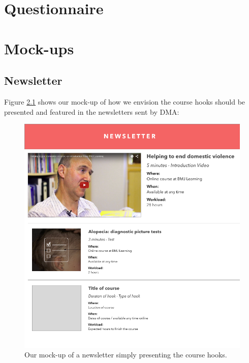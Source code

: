 \begin{appendices}
\chapter{Questionnaire}\label{appendix:questionnaire}


\chapter{Mock-ups}\label{appendix:mockups}

\section{Newsletter}
Figure \ref{fig:newsletter} shows our mock-up of how we envision the course hooks should be presented and featured in the newsletters sent by DMA:

\begin{figure}[h!]
 \begin{center}
  \includegraphics[width=1\textwidth]{figures/newsletter.png}
  \caption{Our mock-up of a newsletter simply presenting the course hooks.\label{fig:newsletter}}
 \end{center}
\end{figure}


\end{appendices}
